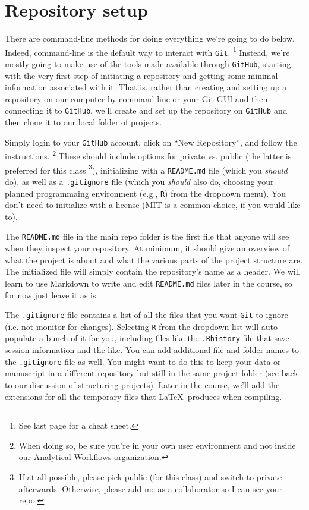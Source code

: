 \documentclass[12pt,letterpaper]{article}
\begin{document}
\section{Repository setup}
There are command-line methods for doing everything we're going to do below.
Indeed, command-line is the default way to interact with \texttt{Git}.
\unskip\footnote{See last page for a cheat sheet.}
Instead, we're mostly going to make use of the tools made available through 
\texttt{GitHub}, 
starting with the very first step of initiating a repository and 
getting some minimal information associated with it.
That is, rather than creating and setting up a repository on our computer by 
command-line or your Git GUI and then connecting it to \texttt{GitHub}, 
we'll create and set up the repository on \texttt{GitHub} and then clone it to our local folder of projects.

Simply login to your \texttt{GitHub} account, 
click on ``New Repository'', 
and follow the instructions.
\unskip
\footnote{
	When doing so, be sure you're in your own user 
environment and not inside our Analytical Workflows organization.}
These should include options for private vs. public
(the latter is preferred for this class
\unskip
\footnote{
	If at all possible, please pick public (for this class) and switch to private afterwards.  
	Otherwise, please add me as a collaborator so I can see your repo.}), 
initializing with a \texttt{README.md} file 
(which you \emph{should} do), 
as well as a \texttt{.gitignore} file 
(which you \emph{should} also do, 
choosing your planned programmaing environment
(e.g., \texttt{R}) from the dropdown menu).
You don't need to initialize with a license 
(MIT is a common choice, if you would like to).

\begin{tcolorbox}[breakable, enhanced, before upper={\parindent15pt}]
	\noindent
	The \texttt{README.md} file in the main repo folder is the first file that anyone will see when they inspect your repository.
	At minimum, it should give an overview of what the project is about and what the various parts of the project structure are.
	The initialized file will simply contain the repository's name as a header.
	We will learn to use Markdown to write and edit \texttt{README.md} files later in the course, 
	so for now just leave it as is.
\end{tcolorbox}

\begin{tcolorbox}[breakable, enhanced, before upper={\parindent15pt}]
	\noindent
	The \texttt{.gitignore} file contains a list of all the files that you want \texttt{Git} to ignore
	(i.e. not monitor for changes).
	Selecting \texttt{R} from the dropdown list will auto-populate a bunch of it for you, 
	including files like the \texttt{.Rhistory} file that save session information and the like.
	You can add additional file and folder names to the \texttt{.gitignore} file as well.
	You might want to do this to keep your data or manuscript in a different repository but still in the same project folder 
	(see back to our discussion of structuring projects).
	Later in the course,
	we'll add the extensions for all the temporary files that \LaTeX\ produces when compiling.
\end{tcolorbox}
\end{document}
